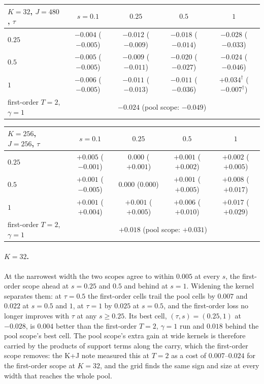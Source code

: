 \documentclass[11pt,a4paper]{article}
\begin{document}
\begin{center}\small
\begin{tabular}{l|cccc}
\toprule
$K = 32$, $J = 480$, $\tau$ & $s{=}0.1$ & $0.25$ & $0.5$ & $1$ \\
\midrule
$0.25$ & $-0.004$ ($-0.005$) & $-0.012$ ($-0.009$) & $-0.018$ ($-0.014$) & $\mathbf{-0.028}$ ($-0.033$) \\
$0.5$  & $-0.005$ ($-0.005$) & $-0.009$ ($-0.011$) & $-0.020$ ($-0.027$) & $-0.024$ ($-0.046$) \\
$1$    & $-0.006$ ($-0.005$) & $-0.011$ ($-0.013$) & $-0.011$ ($-0.036$) & $+0.034^\dagger$ ($-0.007^\dagger$) \\
\midrule
first-order $T{=}2$, $\gamma{=}1$ & \multicolumn{4}{c}{$-0.024$ \quad (pool scope: $-0.049$)} \\
\bottomrule
\end{tabular}
\end{center}

\begin{center}\small
\begin{tabular}{l|cccc}
\toprule
$K = 256$, $J = 256$, $\tau$ & $s{=}0.1$ & $0.25$ & $0.5$ & $1$ \\
\midrule
$0.25$ & $+0.005$ ($-0.001$) & $0.000$ ($+0.001$) & $+0.001$ ($+0.002$) & $+0.002$ ($+0.005$) \\
$0.5$  & $+0.001$ ($-0.005$) & $\mathbf{0.000}$ ($0.000$) & $+0.001$ ($+0.005$) & $+0.008$ ($+0.017$) \\
$1$    & $+0.001$ ($+0.004$) & $+0.001$ ($+0.005$) & $+0.006$ ($+0.010$) & $+0.017$ ($+0.029$) \\
\midrule
first-order $T{=}2$, $\gamma{=}1$ & \multicolumn{4}{c}{$+0.018$ \quad (pool scope: $+0.031$)} \\
\bottomrule
\end{tabular}
\end{center}

\paragraph{$K = 32$.}
At the narrowest width the two scopes agree to within $0.005$ at every $s$,
the first-order scope ahead at $s = 0.25$ and $0.5$ and behind at $s = 1$.
Widening the kernel separates them: at $\tau = 0.5$ the first-order cells
trail the pool cells by $0.007$ and $0.022$ at $s = 0.5$ and $1$, at $\tau =
1$ by $0.025$ at $s = 0.5$, and the first-order loss no longer improves with
$\tau$ at any $s \ge 0.25$. Its best cell, $(\tau, s) = (0.25, 1)$ at
$-0.028$, is $0.004$ better than the first-order $T = 2$, $\gamma = 1$ run and
$0.018$ behind the pool scope's best cell. The pool scope's extra gain at wide
kernels is therefore carried by the products of support terms along the
carry, which the first-order scope removes: the K+J note measured this at
$T = 2$ as a cost of $0.007$--$0.024$ for the first-order scope at $K = 32$,
and the grid finds the same sign and size at every width that reaches the
whole pool.
\end{document}
